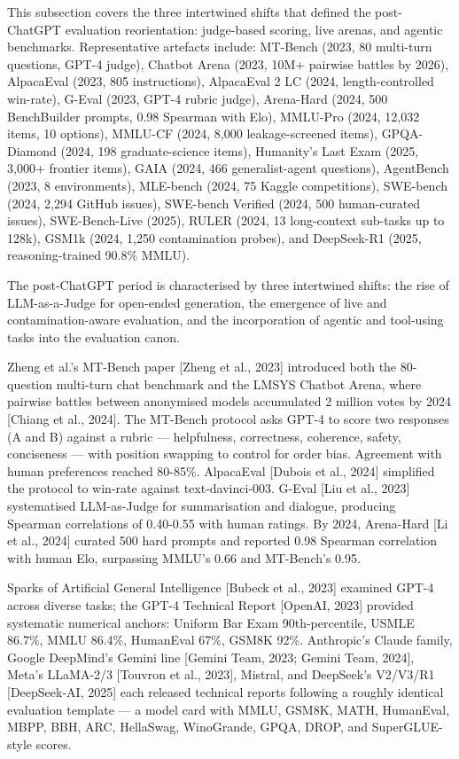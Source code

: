 This subsection covers the three intertwined shifts that defined the post-ChatGPT evaluation reorientation: judge-based scoring, live arenas, and agentic benchmarks. Representative artefacts include: MT-Bench (2023, 80 multi-turn questions, GPT-4 judge), Chatbot Arena (2023, 10M+ pairwise battles by 2026), AlpacaEval (2023, 805 instructions), AlpacaEval 2 LC (2024, length-controlled win-rate), G-Eval (2023, GPT-4 rubric judge), Arena-Hard (2024, 500 BenchBuilder prompts, 0.98 Spearman with Elo), MMLU-Pro (2024, 12,032 items, 10 options), MMLU-CF (2024, 8,000 leakage-screened items), GPQA-Diamond (2024, 198 graduate-science items), Humanity's Last Exam (2025, 3,000+ frontier items), GAIA (2024, 466 generalist-agent questions), AgentBench (2023, 8 environments), MLE-bench (2024, 75 Kaggle competitions), SWE-bench (2024, 2,294 GitHub issues), SWE-bench Verified (2024, 500 human-curated issues), SWE-Bench-Live (2025), RULER (2024, 13 long-context sub-tasks up to 128k), GSM1k (2024, 1,250 contamination probes), and DeepSeek-R1 (2025, reasoning-trained 90.8\% MMLU).

The post-ChatGPT period is characterised by three intertwined shifts: the rise of LLM-as-a-Judge for open-ended generation, the emergence of live and contamination-aware evaluation, and the incorporation of agentic and tool-using tasks into the evaluation canon.

Zheng et al.'s MT-Bench paper {[}Zheng et al., 2023{]} introduced both the 80-question multi-turn chat benchmark and the LMSYS Chatbot Arena, where pairwise battles between anonymised models accumulated 2 million votes by 2024 {[}Chiang et al., 2024{]}. The MT-Bench protocol asks GPT-4 to score two responses (A and B) against a rubric --- helpfulness, correctness, coherence, safety, conciseness --- with position swapping to control for order bias. Agreement with human preferences reached 80-85\%. AlpacaEval {[}Dubois et al., 2024{]} simplified the protocol to win-rate against text-davinci-003. G-Eval {[}Liu et al., 2023{]} systematised LLM-as-Judge for summarisation and dialogue, producing Spearman correlations of 0.40-0.55 with human ratings. By 2024, Arena-Hard {[}Li et al., 2024{]} curated 500 hard prompts and reported 0.98 Spearman correlation with human Elo, surpassing MMLU's 0.66 and MT-Bench's 0.95.

Sparks of Artificial General Intelligence {[}Bubeck et al., 2023{]} examined GPT-4 across diverse tasks; the GPT-4 Technical Report {[}OpenAI, 2023{]} provided systematic numerical anchors: Uniform Bar Exam 90th-percentile, USMLE 86.7\%, MMLU 86.4\%, HumanEval 67\%, GSM8K 92\%. Anthropic's Claude family, Google DeepMind's Gemini line {[}Gemini Team, 2023; Gemini Team, 2024{]}, Meta's LLaMA-2/3 {[}Touvron et al., 2023{]}, Mistral, and DeepSeek's V2/V3/R1 {[}DeepSeek-AI, 2025{]} each released technical reports following a roughly identical evaluation template --- a model card with MMLU, GSM8K, MATH, HumanEval, MBPP, BBH, ARC, HellaSwag, WinoGrande, GPQA, DROP, and SuperGLUE-style scores.


